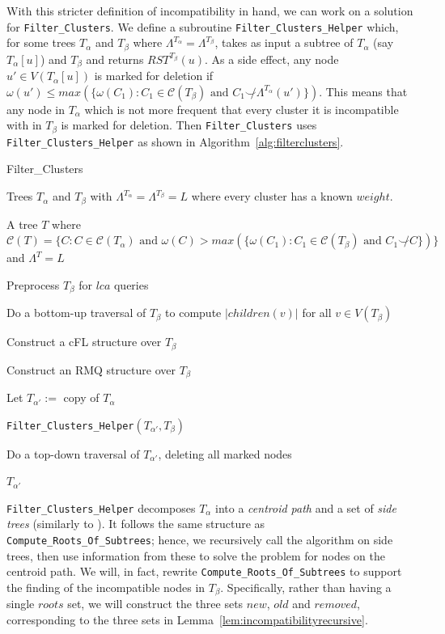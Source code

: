 \documentclass{article}
\newcommand{\compatible}{\smile}
\newcommand{\leafset}{\Lambda}
\newcommand{\weight}{\omega}
\newcommand{\TA}{T_\alpha}
\newcommand{\TB}{T_\beta}
\begin{document}
    With this stricter definition of incompatibility in hand, we can work on a solution for \texttt{Filter\_Clusters}. We define a subroutine \texttt{Filter\_Clusters\_Helper} which, for some trees $\TA$ and $\TB$ where $\leafset^{\TA} = \leafset^{\TB}$, takes as input a subtree of $\TA$ (say $\TA[u]$) and $\TB$ and returns $RST^{\TB}(u)$. As a side effect, any node $u' \in V(\TA[u])$ is marked for deletion if $\weight(u') \leq max(\{\weight(C_1) : C_1 \in \mathcal{C}(\TB) \text{ and } C_1 \not\compatible \leafset^{\TA}(u')\})$. This means that any node in $\TA$ which is not more frequent that every cluster it is incompatible with in $\TB$ is marked for deletion. Then \texttt{Filter\_Clusters} uses \texttt{Filter\_Clusters\_Helper} as shown in Algorithm~\ref{alg:filterclusters}.

    \begin{algorithm}
        \caption{Filter\_Clusters}
        \label{alg:filterclusters}

        \begin{algorithmic}[1]
            \Input Trees $\TA$ and $\TB$ with $\leafset^{\TA} = \leafset^{\TB} = L$ where every cluster has a known $weight$.

            \Output A tree $T$ where $\mathcal{C}(T) = \{C : C \in \mathcal{C}(\TA) \text{ and } \weight(C) > max(\{\weight(C_1) : C_1 \in \mathcal{C}(\TB) \text{ and } C_1 \not\compatible C\})\}$ and $\leafset^T = L$

            \State Preprocess $\TB$ for $lca$ queries

            \State Do a bottom-up traversal of $\TB$ to compute $|children(v)|$ for all $v \in V(\TB)$

            \State Construct a cFL structure over $\TB$

            \State Construct an RMQ structure over $\TB$

            \State Let $T_{\alpha'} :=$ copy of $\TA$

            \State \texttt{Filter\_Clusters\_Helper}$(T_{\alpha'}, \TB)$

            \State Do a top-down traversal of $T_{\alpha'}$, deleting all marked nodes

            \State \Return $T_{\alpha'}$
        \end{algorithmic}
    \end{algorithm}

    \texttt{Filter\_Clusters\_Helper} decomposes $\TA$ into a \textit{centroid path} and a set of \textit{side trees} (similarly to \cite{jansson2018algorithms}). It follows the same structure as \texttt{Compute\_Roots\_Of\_Subtrees}; hence, we recursively call the algorithm on side trees, then use information from these to solve the problem for nodes on the centroid path. We will, in fact, rewrite \texttt{Compute\_Roots\_Of\_Subtrees} to support the finding of the incompatible nodes in $\TB$. Specifically, rather than having a single $roots$ set, we will construct the three sets $new$, $old$ and $removed$, corresponding to the three sets in Lemma~\ref{lem:incompatibilityrecursive}.
\end{document}

